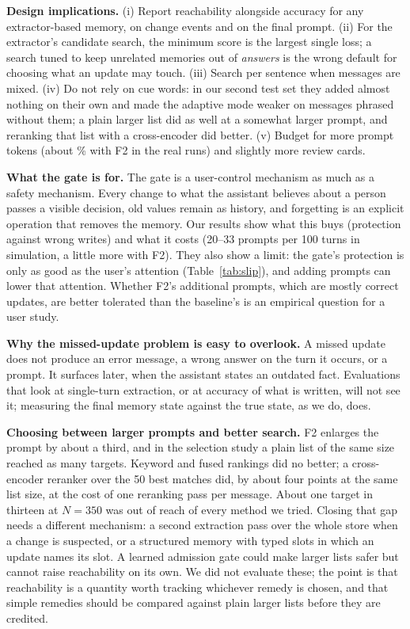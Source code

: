 \IfFileExists{IEEEtran.cls}{\documentclass[journal]{IEEEtran}\def\HAVEIEEE{1}}{\documentclass[10pt,twocolumn]{article}\usepackage[margin=0.7in,columnsep=0.25in]{geometry}}
\begin{document}
\textbf{Design implications.} (i) Report reachability alongside accuracy for any extractor-based memory, on change events and on the final prompt. (ii) For the extractor's candidate search, the minimum score is the largest single loss; a search tuned to keep unrelated memories out of \emph{answers} is the wrong default for choosing what an update may touch. (iii) Search per sentence when messages are mixed. (iv) Do not rely on cue words: in our second test set they added almost nothing on their own and made the adaptive mode weaker on messages phrased without them; a plain larger list did as well at a somewhat larger prompt, and reranking that list with a cross-encoder did better. (v) Budget for more prompt tokens (about \tokInc\% with F2 in the real runs) and slightly more review cards.

\textbf{What the gate is for.} The gate is a user-control mechanism as much as a safety mechanism. Every change to what the assistant believes about a person passes a visible decision, old values remain as history, and forgetting is an explicit operation that removes the memory. Our results show what this buys (protection against wrong writes) and what it costs (20--33 prompts per 100 turns in simulation, a little more with F2). They also show a limit: the gate's protection is only as good as the user's attention (Table~\ref{tab:slip}), and adding prompts can lower that attention. Whether F2's additional prompts, which are mostly correct updates, are better tolerated than the baseline's is an empirical question for a user study.

\textbf{Why the missed-update problem is easy to overlook.} A missed update does not produce an error message, a wrong answer on the turn it occurs, or a prompt. It surfaces later, when the assistant states an outdated fact. Evaluations that look at single-turn extraction, or at accuracy of what is written, will not see it; measuring the final memory state against the true state, as we do, does.

\textbf{Choosing between larger prompts and better search.} F2 enlarges the prompt by about a third, and in the selection study a plain list of the same size reached as many targets. Keyword and fused rankings did no better; a cross-encoder reranker over the 50 best matches did, by about four points at the same list size, at the cost of one reranking pass per message. About one target in thirteen at $N=350$ was out of reach of every method we tried. Closing that gap needs a different mechanism: a second extraction pass over the whole store when a change is suspected, or a structured memory with typed slots in which an update names its slot. A learned admission gate \cite{zhang2026memgate} could make larger lists safer but cannot raise reachability on its own. We did not evaluate these; the point is that reachability is a quantity worth tracking whichever remedy is chosen, and that simple remedies should be compared against plain larger lists before they are credited.
\end{document}
